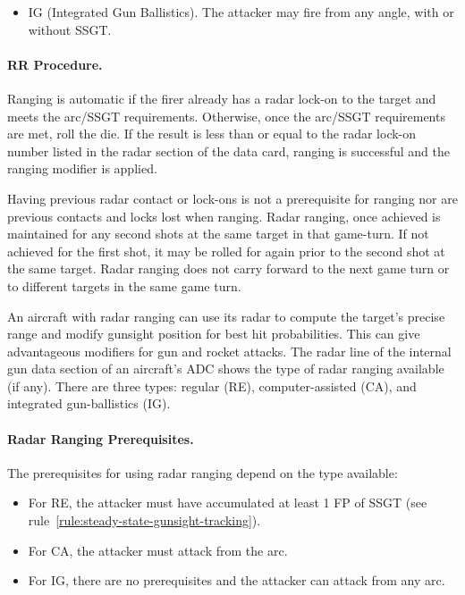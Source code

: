 \begin{advancedrules}
{\begin{itemize}
\item IG (Integrated Gun Ballistics). The attacker may fire from any angle, with or without SSGT.

\end{itemize}

\paragraph{RR Procedure.} Ranging is automatic if the firer already has a radar lock-on to the target and meets the arc/SSGT requirements. Otherwise, once the arc/SSGT requirements are met, roll the die. If the result is less than or equal to the radar lock-on number listed in the radar section of the data card, ranging is successful and the ranging modifier is applied.

Having previous radar contact or lock-ons is not a prerequisite for ranging nor are previous contacts and locks lost when ranging. Radar ranging, once achieved is maintained for any second shots at the same target in that game-turn. If not achieved for the first shot, it may be rolled for again prior to the second shot at the same target. Radar ranging does not carry forward to the next game turn or to different targets in the same game turn.
}{

An aircraft with radar ranging can use its radar to compute the target's precise range and modify gunsight position for best hit probabilities. This can give advantageous modifiers for gun and rocket attacks. The radar line of the internal gun data section of an aircraft's ADC shows the type of radar ranging available (if any). There are three types: regular (RE), computer-assisted (CA), and integrated gun-ballistics (IG).

\paragraph{Radar Ranging Prerequisites.} The prerequisites for using radar ranging depend on the type available:

\begin{itemize}

\item For RE, the attacker must have accumulated at least 1 FP of SSGT (see rule~\ref{rule:steady-state-gunsight-tracking}).

\item For CA, the attacker must attack from the  arc.

\item For IG, there are no prerequisites and the attacker can attack from any arc.


\end{itemize}}
\end{advancedrules}
